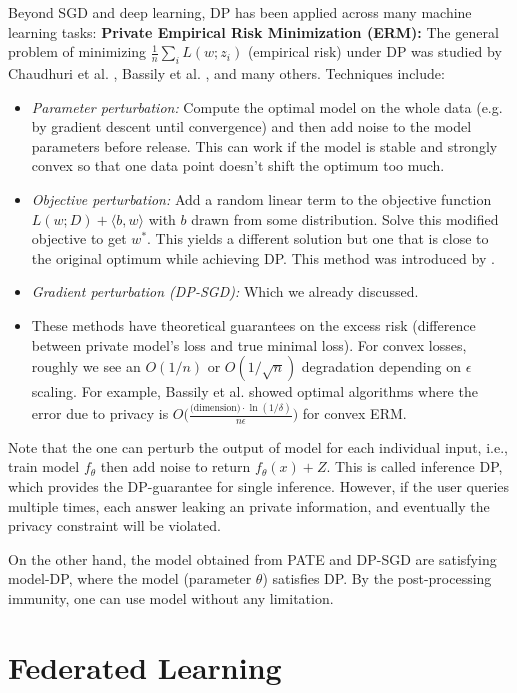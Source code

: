 \documentclass[11pt, a4paper]{article}
\begin{document}
Beyond SGD and deep learning, DP has been applied across many machine learning tasks:
\textbf{Private Empirical Risk Minimization (ERM):} The general problem of minimizing $\frac{1}{n}\sum_{i} L(w; z_i)$ (empirical risk) under DP was studied by Chaudhuri et al. \cite{Chaudhuri2011}, Bassily et al. \cite{Bassily2014}, and many others. Techniques include:
\begin{itemize}
\item  \textit{Parameter perturbation:} Compute the optimal model on the whole data (e.g. by gradient descent until convergence) and then add noise to the model parameters before release. This can work if the model is stable and strongly convex so that one data point doesn’t shift the optimum too much.
\item  \textit{Objective perturbation:} Add a random linear term to the objective function $L(w;D) + \langle b, w \rangle$ with $b$ drawn from some distribution. Solve this modified objective to get $w^*$. This yields a different solution but one that is close to the original optimum while achieving DP. This method was introduced by \cite{Chaudhuri2011}.
\item  \textit{Gradient perturbation (DP-SGD):} Which we already discussed.
\item  These methods have theoretical guarantees on the excess risk (difference between private model's loss and true minimal loss). For convex losses, roughly we see an $O(1/n)$ or $O(1/\sqrt{n})$ degradation depending on $\epsilon$ scaling. For example, Bassily et al. \cite{Bassily2014} showed optimal algorithms where the error due to privacy is $O\Big(\frac{\text{(dimension)} \cdot \ln(1/\delta)}{n \epsilon}\Big)$ for convex ERM.
\end{itemize}
Note that the one can perturb the output of model for each individual input, 
i.e., train model $f_\theta$ then add noise to return $f_\theta(x)+Z$.
This is called inference DP, which provides the DP-guarantee for single inference.
However, if the user queries multiple times, each answer leaking an private information,
and eventually the privacy constraint will be violated.

On the other hand, the model obtained from PATE and DP-SGD are satisfying model-DP, where the model (parameter $\theta$) satisfies DP.
By the post-processing immunity, one can use model without any limitation.

\section{Federated Learning}
\end{document}
